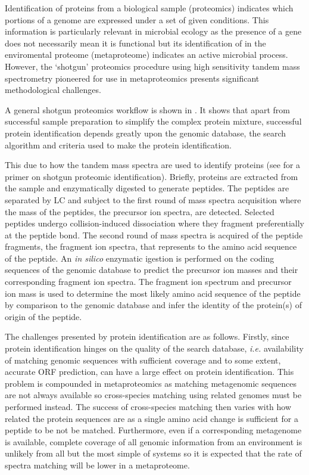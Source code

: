 Identification of proteins from a biological sample (proteomics) indicates which portions of a genome are expressed under a set of given conditions.
This information is particularly relevant in microbial ecology as the presence of a gene does not necessarily mean it is functional but its identification of in the enviromental proteome (metaproteome) indicates an active microbial process.
However, the `shotgun' proteomics procedure using high sensitivity tandem mass spectrometry pioneered for use in metaproteomics \cite{Ram2005} presents significant methodological challenges.

A general shotgun proteomics workflow is shown in .
It shows that apart from successful sample preparation to simplify the complex protein mixture, successful protein identification depends greatly upon the genomic database, the search algorithm and criteria used to make the protein identification.

This due to how the tandem mass spectra are used to identify proteins (see \citet{Marcotte2007} for a primer on shotgun proteomic identification).
Briefly, proteins are extracted from the sample and enzymatically digested to generate peptides.
The peptides are separated by \ac{LC} and subject to the first round of mass spectra acquisition where the mass of the peptides, the precursor ion spectra, are detected.
Selected peptides undergo collision-induced dissociation where they fragment preferentially at the peptide bond.
The second round of mass spectra is acquired of the peptide fragments, the fragment ion spectra, that represents to the amino acid sequence of the peptide.
An \emph{in silico} enzymatic igestion is performed on the coding sequences of the genomic database to predict the precursor ion masses and their corresponding fragment ion spectra.
The fragment ion spectrum and precursor ion mass is used to determine the most likely amino acid sequence of the peptide by comparison to the genomic database and infer the identity of the protein(s) of origin of the peptide.

The challenges presented by protein identification are as follows.
Firstly, since protein identification hinges on the quality of the search database, \emph{i.e.} availability of matching genomic sequences with sufficient coverage and to some extent, accurate \ac{ORF} prediction, can have a large effect on protein identification.
This problem is compounded in metaproteomics as matching metagenomic sequences are not always available so cross-species matching using related genomes must be performed instead.
The success of cross-species matching then varies with how related the protein sequences are as a single amino acid change is sufficient for a peptide to be not be matched.
Furthermore, even if a corresponding metagenome is available, complete coverage of all genomic information from an environment is unlikely from all but the most simple of systems so it is expected that the rate of spectra matching will be lower in a metaproteome.

